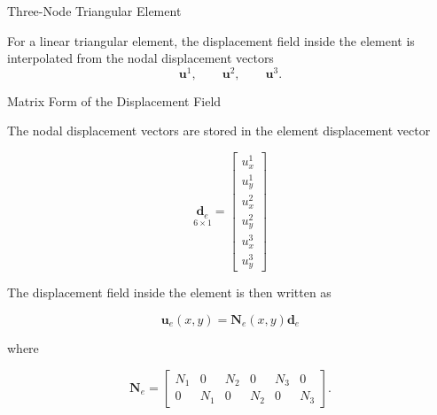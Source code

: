 \documentclass[aspectratio=169]{beamer}
\begin{document}
\begin{frame}{Three-Node Triangular Element}

\centering


\bigskip

For a linear triangular element, the displacement field inside the element
is interpolated from the nodal displacement vectors
\[
\mathbf{u}^1,\qquad \mathbf{u}^2,\qquad \mathbf{u}^3.
\]

\end{frame}
\begin{frame}{Matrix Form of the Displacement Field}

The nodal displacement vectors are stored in the element displacement vector

\[
\underset{6\times 1}{\mathbf{d}_e} =
\begin{bmatrix}
u_x^1 \\
u_y^1 \\
u_x^2 \\
u_y^2 \\
u_x^3 \\
u_y^3
\end{bmatrix}
\]

The displacement field inside the element is then written as

\[
\mathbf{u}_e(x,y)=\mathbf{N}_e(x,y)\mathbf{d}_e
\]

where

\[
\mathbf{N}_e =
\begin{bmatrix}
N_1 & 0 & N_2 & 0 & N_3 & 0 \\
0 & N_1 & 0 & N_2 & 0 & N_3
\end{bmatrix}.
\]

\end{frame}
\end{document}
